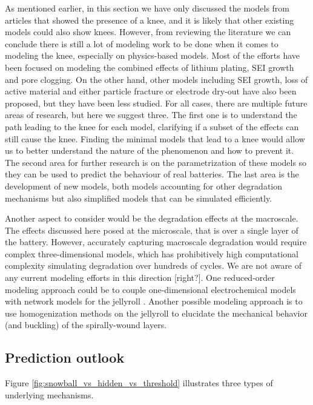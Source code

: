 \documentclass[journal=jpcl, manuscript=article, layout=onecolumn]{achemso}
\begin{document}
As mentioned earlier, in this section we have only discussed the models from articles that showed the presence of a knee, and it is likely that other existing models could also show knees. However, from reviewing the literature we can conclude there is still a lot of modeling work to be done when it comes to modeling the knee, especially on physics-based models. Most of the efforts have been focused on modeling the combined effects of lithium plating, SEI growth and pore clogging. On the other hand, other models including SEI growth, loss of active material and either particle fracture or electrode dry-out have also been proposed, but they have been less studied. For all cases, there are multiple future areas of research, but here we suggest three. The first one is to understand the path leading to the knee for each model, clarifying if a subset of the effects can still cause the knee. Finding the minimal models that lead to a knee would allow us to better understand the nature of the phenomenon and how to prevent it. The second area for further research is on the parametrization of these models so they can be used to predict the behaviour of real batteries. The last area is the development of new models, both models accounting for other degradation mechanisms but also simplified models that can be simulated efficiently.

Another aspect to consider would be the degradation effects at the macroscale. The effects discussed here posed at the microscale, that is over a single layer of the battery. However, accurately capturing macroscale degradation would require complex three-dimensional models, which has prohibitively high computational complexity simulating degradation over hundreds of cycles. We are not aware of any current modeling efforts in this direction [right?]. One reduced-order modeling approach could be to couple one-dimensional electrochemical models with network models for the jellyroll \cite{tranter_probing_2020}. Another possible modeling approach is to use homogenization methods on the jellyroll \cite{psaltis_homogenisation_2020} to elucidate the mechanical behavior (and buckling) of the spirally-wound layers.

\subsection{Prediction outlook}

Figure \ref{fig:snowball_vs_hidden_vs_threshold} illustrates three types of underlying mechanisms.
\end{document}
